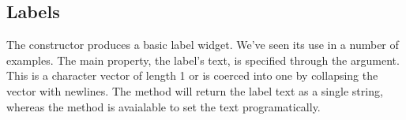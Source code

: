 










\subsection{Labels}
\label{asec:gWidgets-labels}

The  constructor produces a basic label
widget. We've seen its use in a number of examples. The main property,
the label's text, is specified through the 
argument. This is a character vector of length 1 or is coerced into
one by collapsing the vector with newlines. The
 method will return the label text as a single
string, whereas the  method is avaialable
to set the text programatically.

